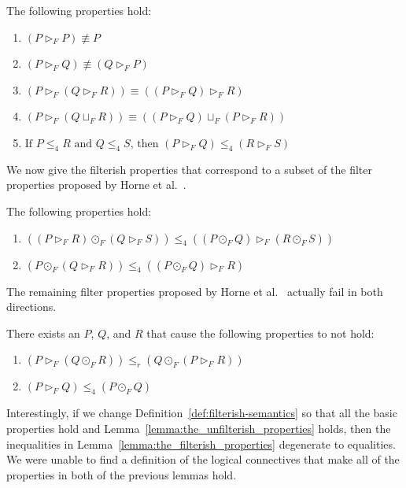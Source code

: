 \documentclass{llncs}
\begin{document}
\begin{lemma}
  \label{lemma:basic_properties_for_parallel}
  The following properties hold:
  \begin{enumerate}
  \item $(P \rhd_F P) \not\equiv P$\\[-5px]
  \item $(P \rhd_F Q) \not\equiv (Q \rhd_F P)$\\[-5px]
  \item $(P \rhd_F (Q \rhd_F R)) \equiv ((P \rhd_F Q) \rhd_F R)$\\[-5px]
  \item $(P \rhd_F (Q \sqcup_F R)) \equiv ((P \rhd_F Q) \sqcup_F (P \rhd_F R))$\\[-5px]
  \item $\text{If }P \leq_4 R \text{ and } Q \leq_4 S \text{, then } (P \rhd_F Q) \leq_4 (R \rhd_F S)$
  \end{enumerate}
\end{lemma}
We now give the filterish properties that correspond to a subset of
the filter properties proposed by Horne et
al.~\cite{horne2017semantics}.
\begin{lemma}
  \label{lemma:the_filterish_properties}
  The following properties hold:
  \begin{enumerate}
  \item $((P \rhd_F R) \odot_F (Q \rhd_F S)) \leq_4 ((P \odot_F Q) \rhd_F (R \odot_F S))$\\[-5px]
  \item $(P \odot_F (Q \rhd_F R)) \leq_4 ((P \odot_F Q) \rhd_F R)$
  \end{enumerate}
\end{lemma}
The remaining filter properties proposed by Horne et
al.~\cite{horne2017semantics} actually fail in both directions.
\begin{lemma}
  \label{lemma:the_unfilterish_properties}
  There exists an $P$, $Q$, and $R$ that cause the following
  properties to not hold:
  \begin{enumerate}
  \item $(P \rhd_F (Q \odot_F R)) \leq_r (Q \odot_F (P \rhd_F R))$\\[-5px]
  \item $(P \rhd_F Q) \leq_4 (P \odot_F Q)$
  \end{enumerate}
\end{lemma}
Interestingly, if we change Definition~\ref{def:filterish-semantics}
so that all the basic properties hold and
Lemma~\ref{lemma:the_unfilterish_properties} holds, then the
inequalities in Lemma~\ref{lemma:the_filterish_properties} degenerate
to equalities.  We were unable to find a definition of the logical
connectives that make all of the properties in both of the previous
lemmas hold.
\end{document}
